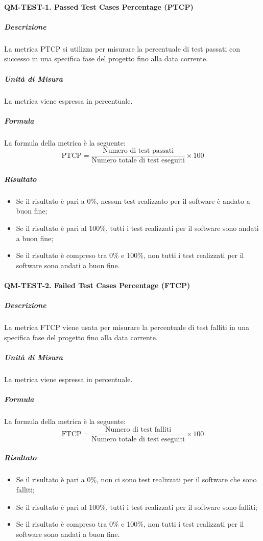 		\paragraph{QM-TEST-1. Passed Test Cases Percentage (PTCP)}

			\subparagraph{Descrizione}
			La metrica PTCP si utilizza per misurare la percentuale di test passati con successo in una specifica fase del progetto fino alla data corrente.

			\subparagraph{Unità di Misura}
			La metrica viene espressa in percentuale.

			\subparagraph{Formula}
			La formula della metrica è la seguente:
			\[
				\text{PTCP} = \frac{\text{Numero di test passati}}{\text{Numero totale di test eseguiti}} \times 100
			\]

			\subparagraph{Risultato}
			\begin{itemize}
				\item Se il risultato è pari a 0\%, nessun test realizzato per il software è andato a buon fine;
				\item Se il risultato è pari al 100\%, tutti i test realizzati per il software sono andati a buon fine;
				\item Se il risultato è compreso tra 0\% e 100\%, non tutti i test realizzati per il software sono andati a buon fine.
			\end{itemize}

		\paragraph{QM-TEST-2. Failed Test Cases Percentage (FTCP)}

			\subparagraph{Descrizione}
			La metrica FTCP viene usata per misurare la percentuale di test falliti in una specifica fase del progetto fino alla data corrente.

			\subparagraph{Unità di Misura}
			La metrica viene espressa in percentuale.

			\subparagraph{Formula}
			La formula della metrica è la seguente:
			\[
				\text{FTCP} = \frac{\text{Numero di test falliti}}{\text{Numero totale di test eseguiti}} \times 100
			\]

			\subparagraph{Risultato}
			\begin{itemize}
				\item Se il risultato è pari a 0\%, non ci sono test realizzati per il software che sono falliti;
				\item Se il risultato è pari al 100\%, tutti i test realizzati per il software sono falliti;
				\item Se il risultato è compreso tra 0\% e 100\%, non tutti i test realizzati per il software sono andati a buon fine.
			\end{itemize}

